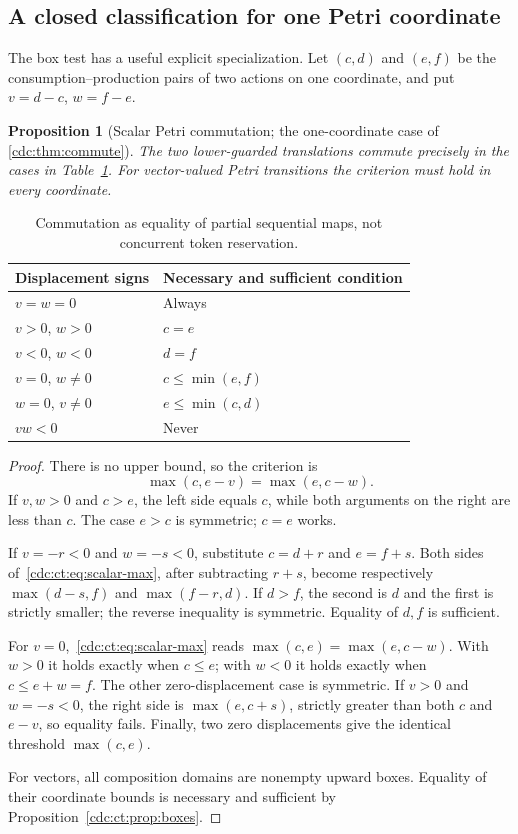 \documentclass[11pt,a4paper]{article}
\newtheorem{proposition}[proposition]{Proposition}
\theoremstyle{definition}
\theoremstyle{remark}
\begin{document}
\subsection{A closed classification for one Petri coordinate}
The box test has a useful explicit specialization. Let $(c,d)$ and $(e,f)$ be the consumption--production pairs of two actions on one coordinate, and put $v=d-c$, $w=f-e$.
\begin{proposition}[Scalar Petri commutation; the one-coordinate case of \cref{cdc:thm:commute}]\label{cdc:ct:prop:petri-commute}
The two lower-guarded translations commute precisely in the cases in Table~\ref{cdc:ct:tab:scalar}. For vector-valued Petri transitions the criterion must hold in every coordinate.
\end{proposition}
\begin{table}[ht]
\centering
\begin{tabular}{ll}
\toprule
Displacement signs & Necessary and sufficient condition \\\midrule
$v=w=0$ & Always\\
$v>0$, $w>0$ & $c=e$\\
$v<0$, $w<0$ & $d=f$\\
$v=0$, $w\ne0$ & $c\le\min(e,f)$\\
$w=0$, $v\ne0$ & $e\le\min(c,d)$\\
$vw<0$ & Never\\
\bottomrule
\end{tabular}
\caption{Commutation as equality of partial sequential maps, not concurrent token reservation.}\label{cdc:ct:tab:scalar}
\end{table}
\begin{proof}
There is no upper bound, so the criterion is
\begin{equation}\label{cdc:ct:eq:scalar-max}
 \max(c,e-v)=\max(e,c-w).
\end{equation}
If $v,w>0$ and $c>e$, the left side equals $c$, while both arguments on the right are less than $c$. The case $e>c$ is symmetric; $c=e$ works.

If $v=-r<0$ and $w=-s<0$, substitute $c=d+r$ and $e=f+s$. Both sides of~\eqref{cdc:ct:eq:scalar-max}, after subtracting $r+s$, become respectively $\max(d-s,f)$ and $\max(f-r,d)$. If $d>f$, the second is $d$ and the first is strictly smaller; the reverse inequality is symmetric. Equality of $d,f$ is sufficient.

For $v=0$,~\eqref{cdc:ct:eq:scalar-max} reads $\max(c,e)=\max(e,c-w)$. With $w>0$ it holds exactly when $c\le e$; with $w<0$ it holds exactly when $c\le e+w=f$. The other zero-displacement case is symmetric. If $v>0$ and $w=-s<0$, the right side is $\max(e,c+s)$, strictly greater than both $c$ and $e-v$, so equality fails. Finally, two zero displacements give the identical threshold $\max(c,e)$.

For vectors, all composition domains are nonempty upward boxes. Equality of their coordinate bounds is necessary and sufficient by Proposition~\ref{cdc:ct:prop:boxes}.
\end{proof}
\end{document}
